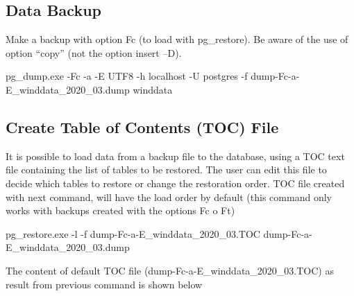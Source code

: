 \documentclass[12pt,oneside]{reedthesis}
\newenvironment{Shaded}{\begin{snugshade}}{\end{snugshade}}
\newcommand{\ExtensionTok}[1]{#1}
\newcommand{\NormalTok}[1]{#1}
\begin{document}
\hypertarget{data-backup}{%
\subsection{Data Backup}\label{data-backup}}

Make a backup with option Fc (to load with pg\_restore). Be aware of the use of option ``copy'' (not the option insert --D).

\scriptsize

\vspace{0.4cm}
\begin{Shaded}
\begin{Highlighting}[]
      \ExtensionTok{pg_dump.exe}\NormalTok{ -Fc -a -E UTF8 -h localhost -U postgres -f dump-Fc-a-E_winddata_2020_03.dump winddata}
\end{Highlighting}
\end{Shaded}
\normalsize

\hypertarget{create-table-of-contents-toc-file}{%
\subsection{Create Table of Contents (TOC) File}\label{create-table-of-contents-toc-file}}

It is possible to load data from a backup file to the database, using a TOC text file containing the list of tables to be restored. The user can edit this file to decide which tables to restore or change the restoration order. TOC file created with next command, will have the load order by default (this command only works with backups created with the options Fc o Ft)

\scriptsize

\vspace{0.4cm}
\begin{Shaded}
\begin{Highlighting}[]
      \ExtensionTok{pg_restore.exe}\NormalTok{ -l -f dump-Fc-a-E_winddata_2020_03.TOC dump-Fc-a-E_winddata_2020_03.dump}
\end{Highlighting}
\end{Shaded}
\normalsize

The content of default TOC file (dump-Fc-a-E\_winddata\_2020\_03.TOC) as result from previous command is shown below

\scriptsize
\end{document}
